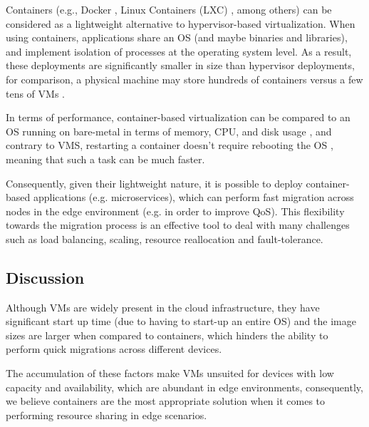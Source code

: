 Containers (e.g., Docker \cite{docker}, Linux Containers (LXC) \cite{lxc}, among others) can be considered as a lightweight alternative to hypervisor-based virtualization. When using containers, applications share an OS (and maybe binaries and libraries), and implement isolation of processes at the operating system level. As a result, these deployments are significantly smaller in size than hypervisor deployments, for comparison, a physical machine may store hundreds of containers versus a few tens of VMs \cite{7036275}.  

In terms of performance, container-based virtualization can be compared to an OS running on bare-metal in terms of memory, CPU, and disk usage \cite{preeth2015evaluation}, and contrary to VMS, restarting a container doesn't require rebooting the OS \cite{7036275}, meaning that such a task can be much faster.

Consequently, given their lightweight nature, it is possible to deploy container-based applications (e.g. microservices), which can perform fast migration across nodes in the edge environment (e.g. in order to improve QoS). This flexibility towards the migration process is an effective tool to deal with many challenges such as load balancing, scaling, resource reallocation and fault-tolerance. 

\subsection{Discussion}

Although VMs are widely present in the cloud infrastructure, they have significant start up time (due to having to start-up an entire OS) and the image sizes are larger when compared to containers, which hinders the ability to perform quick migrations across different devices. 

The accumulation of these factors make VMs unsuited for devices with low capacity and availability, which are abundant in edge environments, consequently, we believe containers are the most appropriate solution when it comes to performing resource sharing in edge scenarios. 